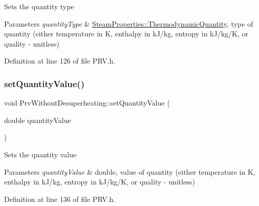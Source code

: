 Sets the quantity type


\begin{DoxyParams}{Parameters}
{\em quantity\+Type} & \hyperlink{class_steam_properties_ae0294bedf7d178c2d8fb6aed0f62fbff}{Steam\+Properties\+::\+Thermodynamic\+Quantity}, type of quantity (either temperature in K, enthalpy in k\+J/kg, entropy in k\+J/kg/K, or quality -\/ unitless) \\
\hline
\end{DoxyParams}


Definition at line 126 of file P\+R\+V.\+h.

\mbox{\label{class_prv_without_desuperheating_a5ed2d0f0f558705d482ed0502131757f}} 
\subsubsection{\texorpdfstring{set\+Quantity\+Value()}{setQuantityValue()}\hspace{0.1cm}{\footnotesize\ttfamily [1/3]}}
{\footnotesize\ttfamily void Prv\+Without\+Desuperheating\+::set\+Quantity\+Value (\begin{DoxyParamCaption}\item[{double}]{quantity\+Value }\end{DoxyParamCaption})\hspace{0.3cm}{\ttfamily [inline]}}

Sets the quantity value


\begin{DoxyParams}{Parameters}
{\em quantity\+Value} & double, value of quantity (either temperature in K, enthalpy in k\+J/kg, entropy in k\+J/kg/K, or quality -\/ unitless) \\
\hline
\end{DoxyParams}


Definition at line 136 of file P\+R\+V.\+h.

\mbox{\label{class_prv_without_desuperheating_a5ed2d0f0f558705d482ed0502131757f}} 
